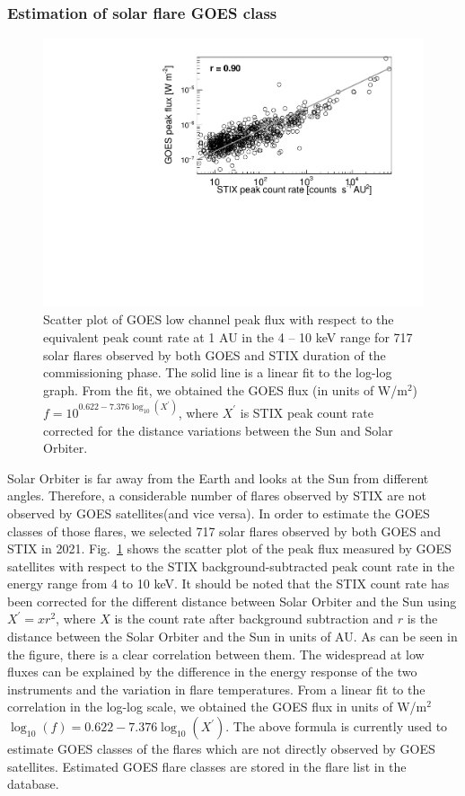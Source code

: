 \documentclass[referee]{aa} %
\begin{document}
\subsubsection{Estimation of solar flare GOES class }
\begin{figure}
  \centering
  \includegraphics[width=0.8\linewidth]{figures/goes_stix_flux_paper.pdf}
  \caption{Scatter plot of GOES low channel peak flux with respect to the equivalent  peak count rate  at 1 AU
   in the 4 -- 10 keV range
  for 717 solar flares observed by both GOES and STIX duration of the commissioning phase. 
  The solid line is a linear fit to the log-log graph. 
From the fit, we obtained 
the GOES flux (in units of W/m$^2$) $f = 10^{0.622 -7.376 \log_{10} (X^{'})}$,
where $X^{'}$ is STIX peak count rate corrected for the distance variations between the Sun and Solar Orbiter. 
}
\label{fig:goes-stix}
\end{figure}
Solar Orbiter is far away from the Earth and looks at 
the Sun from different angles. Therefore, a considerable number of flares observed by STIX
 are not observed by GOES satellites(and vice versa). 
In order to estimate the GOES classes of those flares, 
we selected 717 solar flares observed by both GOES and  STIX  in 2021. 
Fig.~\ref{fig:goes-stix} shows the scatter plot of the peak flux
measured by GOES satellites
 with respect to the STIX background-subtracted peak count rate in the energy range from 4 to 10 keV. 
It should be noted that the STIX count rate 
has been corrected for 
the different distance between Solar Orbiter and the Sun using $X^{'}=x r^2$, where $X$ is the count rate after background subtraction
 and $r$ is the distance between the Solar Orbiter and the Sun in units of AU. 
As can be seen in the figure, there is a clear correlation between
them.  The widespread at low fluxes can be explained by the difference in 
the energy response of the two instruments and the variation in flare temperatures. 
From a linear fit to the correlation in the log-log scale, 
we obtained the GOES flux in units of W/m$^2$ $\log_{10}(f) = 0.622 -7.376 \log_{10} (X^{'})$.
The above formula is currently used to estimate GOES classes of the flares
which are not directly observed by GOES satellites.  
Estimated GOES flare classes are stored in the flare list in the database. 
\end{document}
